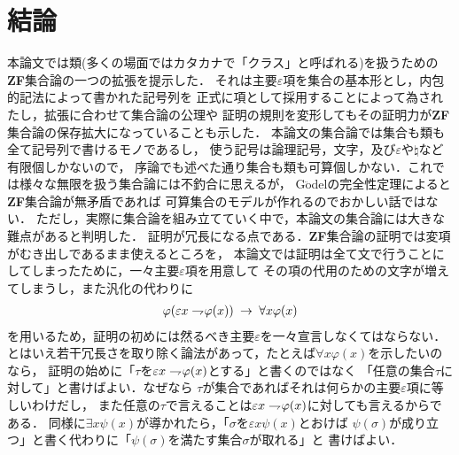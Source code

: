 \chapter{結論}
	本論文では類(多くの場面ではカタカナで「クラス」と呼ばれる)を扱うための{\bf ZF}集合論の一つの拡張を提示した．
	それは主要$\varepsilon$項を集合の基本形とし，内包的記法によって書かれた記号列を
	正式に項として採用することによって為されたし，拡張に合わせて集合論の公理や
	証明の規則を変形してもその証明力が{\bf ZF}集合論の保存拡大になっていることも示した．
	本論文の集合論では集合も類も全て記号列で書けるモノであるし，
	使う記号は論理記号，文字，及び$\varepsilon$や$\natural$など有限個しかないので，
	序論でも述べた通り集合も類も可算個しかない．これでは様々な無限を扱う集合論には不釣合に思えるが，
	G$\ddot{\mbox{o}}$delの完全性定理によると{\bf ZF}集合論が無矛盾であれば
	可算集合のモデルが作れるのでおかしい話ではない．
	ただし，実際に集合論を組み立てていく中で，本論文の集合論には大きな難点があると判明した．
	証明が冗長になる点である．{\bf ZF}集合論の証明では変項がむき出しであるまま使えるところを，
	本論文では証明は全て文で行うことにしてしまったために，一々主要$\varepsilon$項を用意して
	その項の代用のための文字が増えてしまうし，また汎化の代わりに
	\begin{align}
		\varphi(\varepsilon x \rightharpoondown\hspace{-0.25em} \varphi(x)) \hspace{0.25em}\rightarrow\hspace{0.25em} \forall x \varphi(x)
	\end{align}
	を用いるため，証明の初めには然るべき主要$\varepsilon$を一々宣言しなくてはならない．
	とはいえ若干冗長さを取り除く論法があって，たとえば$\forall x \varphi(x)$を示したいのなら，
	証明の始めに「$\tau$を$\varepsilon x \rightharpoondown\hspace{-0.25em} \varphi(x)$とする」と書くのではなく
	「任意の集合$\tau$に対して」と書けばよい．なぜなら
	$\tau$が集合であればそれは何らかの主要$\varepsilon$項に等しいわけだし，
	また任意の$\tau$で言えることは$\varepsilon x \rightharpoondown\hspace{-0.25em} \varphi(x)$に対しても言えるからである．
	同様に$\exists x \psi(x)$が導かれたら，「$\sigma$を$\varepsilon x \psi(x)$とおけば
	$\psi(\sigma)$が成り立つ」と書く代わりに「$\psi(\sigma)$を満たす集合$\sigma$が取れる」と
	書けばよい．
